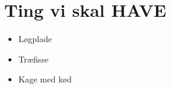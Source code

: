 \section{Ting vi skal HAVE}
\begin{itemize}
\item Løgplade
\item Træfisse
\item Kage med kød
\end{itemize}